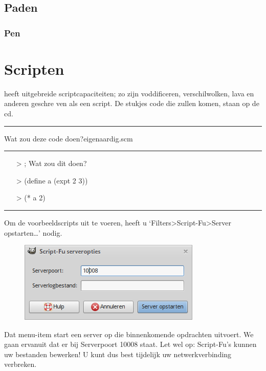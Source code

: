 \documentclass[11pt,a5paper,twoside]{book}
\begin{document}
\chapter{Paden}
 \section{Pen}\label{ding:pen}
\iffalse
\part{Scripten}
 \GIMP{} heeft uit\-ge\-brei\-de script\-ca\-pa\-ci\-teit\-en; zo zijn
  vod\-di\-fi\-ce\-ren, ver\-schil\-wol\-ken, lava en an\-de\-ren ge\-schre%
  \-ven als een script.
 De stukjes code die zullen komen, staan op de cd.
 \newenvironment{bCode}[2]{%
  \\\rule{\linewidth}{0.4ex}%
  \begin{center}
   #2\hspace{4em}#1
  \end{center}
  \rule{\linewidth}{0.4ex}%
  \setlength\itemsep{1em}
  \begin{itemize}
   \ttfamily
  \setcounter{Lijn}{0}
  \newcommand{\lijn}{\stepcounter{Lijn}%
  \item[\theLijn>]}%
 }{%
  \end{itemize}%
  \rule{\linewidth}{0.8ex}
 }
 \begin{bCode}{eigenaardig.scm}{Wat zou deze code doen?}
  \lijn ; Wat zou dit doen?
  \lijn (define a (expt 2 3))
  \lijn (* a 2)
 \end{bCode}
 Om de voor\-beeld\-scripts uit te voeren, heeft u
  ‘Filters>Script-Fu>Server opstarten…’ nodig.
 \begin{figure}[h!]
  \centering
  \includegraphics[width=0.9\linewidth]{script/server.png}
 \end{figure}
 Dat menu-item start een server
  op die bin\-nen\-komen\-de op\-dracht\-en uitvoert.
 We gaan ervanuit dat er bij Serverpoort 10008 staat.
 Let wel op: Script-Fu’s kunnen uw be\-stan\-den be\-wer\-ken!
 U kunt dus best tijdelijk uw net\-werk\-ver\-bin\-ding ver\-bre\-ken.
\end{document}
